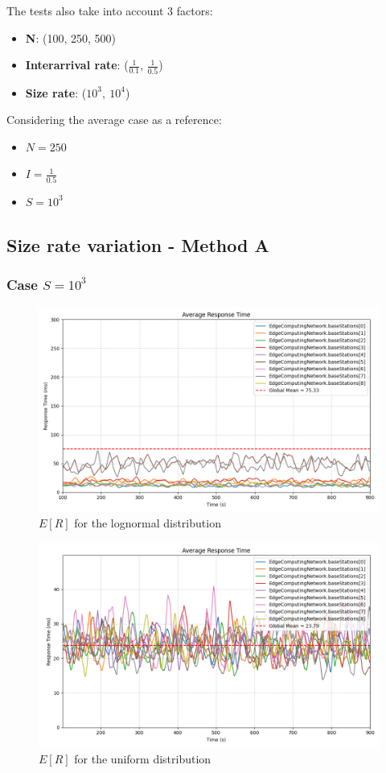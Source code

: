 \documentclass{report}
\begin{document}
The tests also take into account 3 factors:
\begin{itemize}
    \item \textbf{N}: (100, 250, 500)
    \item \textbf{Interarrival rate}: ($\frac{1}{0.1}$, $\frac{1}{0.5}$)
    \item \textbf{Size rate}: ($10^3,\ 10^4$)
\end{itemize}

Considering the average case as a reference:
\begin{itemize}
    \item $N=250$
    \item $I=\frac{1}{0.5}$
    \item $S=10^3$
\end{itemize}

\subsection{Size rate variation - Method A}
\subsubsection*{Case $S=10^3$}

\begin{figure}[H]
    \centering
    \includegraphics[width=\textwidth]{img/plots/log_1e3_A/resptime.png}
    \caption{$E[R]$ for the lognormal distribution}
\end{figure}

\begin{figure}[H]
    \centering
    \includegraphics[width=\textwidth]{img/plots/uni_1e3_A/resptime.png}
    \caption{$E[R]$ for the uniform distribution}
\end{figure}
\end{document}
